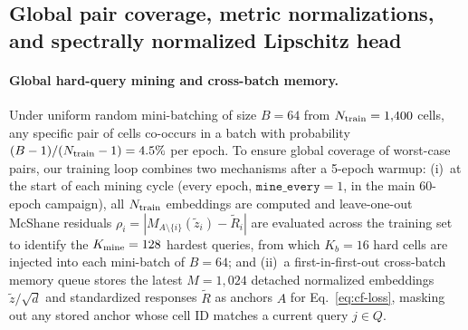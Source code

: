 \documentclass[preprint,11pt,a4paper]{elsarticle}
\begin{document}
\subsection{Global pair coverage, metric normalizations, and spectrally normalized Lipschitz head}
\label{sec:coverage}
\label{sec:metric}
\label{sec:liphead}

\paragraph{Global hard-query mining and cross-batch memory.}
Under uniform random mini-batching of size $B=64$ from $N_{\rm train}=1{,}400$ cells, any specific pair of cells co-occurs in a batch with probability $(B-1)/(N_{\rm train}-1)=4.5\%$ per epoch. To ensure global coverage of worst-case pairs, our training loop combines two mechanisms after a 5-epoch warmup:
(i)~at the start of each mining cycle (every epoch, $\texttt{mine\_every}=1$, in the main 60-epoch campaign), all $N_{\rm train}$ embeddings are computed and leave-one-out McShane residuals $\rho_i=|M_{A\setminus\{i\}}(\tilde z_i)-\tilde R_i|$ are evaluated across the training set to identify the $K_{\rm mine}=128$ hardest queries, from which $K_b=16$ hard cells are injected into each mini-batch of $B=64$; and
(ii)~a first-in-first-out cross-batch memory queue \cite{XBM2020} stores the latest $M=1{,}024$ detached normalized embeddings $\tilde z/\sqrt d$ and standardized responses $\tilde R$ as anchors $A$ for Eq.~\eqref{eq:cf-loss}, masking out any stored anchor whose cell ID matches a current query $j\in Q$.
\end{document}
